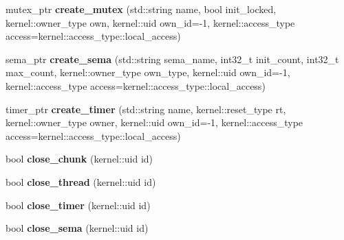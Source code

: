 \begin{DoxyCompactItemize}
\item 
\mbox{\label{classeka2l1_1_1kernel__system_ab6a00e6a9e9a79b9ccb29b30a132fbaf}} 
mutex\+\_\+ptr {\bfseries create\+\_\+mutex} (std\+::string name, bool init\+\_\+locked, kernel\+::owner\+\_\+type own, kernel\+::uid own\+\_\+id=-\/1, kernel\+::access\+\_\+type access=kernel\+::access\+\_\+type\+::local\+\_\+access)
\item 
\mbox{\label{classeka2l1_1_1kernel__system_a7d9e32b8f55e47825e7b1bb52c431d2f}} 
sema\+\_\+ptr {\bfseries create\+\_\+sema} (std\+::string sema\+\_\+name, int32\+\_\+t init\+\_\+count, int32\+\_\+t max\+\_\+count, kernel\+::owner\+\_\+type own\+\_\+type, kernel\+::uid own\+\_\+id=-\/1, kernel\+::access\+\_\+type access=kernel\+::access\+\_\+type\+::local\+\_\+access)
\item 
\mbox{\label{classeka2l1_1_1kernel__system_a85662d4dd0150f3f5012b34cbb82ec3f}} 
timer\+\_\+ptr {\bfseries create\+\_\+timer} (std\+::string name, kernel\+::reset\+\_\+type rt, kernel\+::owner\+\_\+type owner, kernel\+::uid own\+\_\+id=-\/1, kernel\+::access\+\_\+type access=kernel\+::access\+\_\+type\+::local\+\_\+access)
\item 
\mbox{\label{classeka2l1_1_1kernel__system_ab7e3f17267daa726b656633096f540d1}} 
bool {\bfseries close\+\_\+chunk} (kernel\+::uid id)
\item 
\mbox{\label{classeka2l1_1_1kernel__system_a57149bf38c415629b56a4466fdd90409}} 
bool {\bfseries close\+\_\+thread} (kernel\+::uid id)
\item 
\mbox{\label{classeka2l1_1_1kernel__system_a6c00c5ae360cfd86270d103dba82024c}} 
bool {\bfseries close\+\_\+timer} (kernel\+::uid id)
\item 
\mbox{\label{classeka2l1_1_1kernel__system_a573af658d315fe994d17c993f308cc19}} 
bool {\bfseries close\+\_\+sema} (kernel\+::uid id)
\item 
\mbox{\label{classeka2l1_1_1kernel__system_a8ee700d14c5307fccb89b6de85d58327}} 

\end{DoxyCompactItemize}
